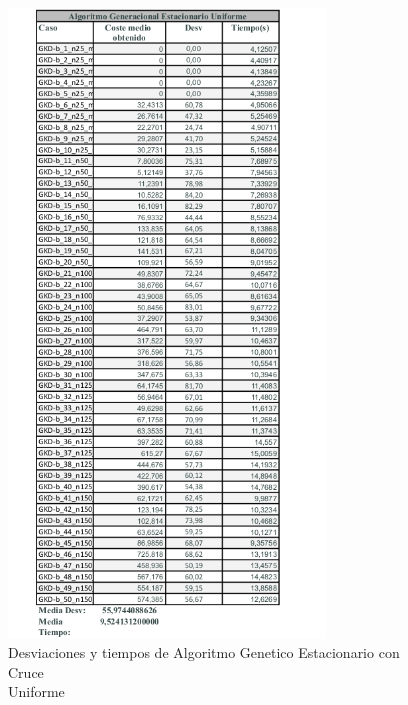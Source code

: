 \documentclass{article}
\begin{document}
\begin{figure}[h]
  \centering
  \includegraphics[width=0.75\textwidth]{capturastablas/AGE-Uniforme.png}
  \caption{Desviaciones y tiempos de Algoritmo Genetico Estacionario con Cruce \\
  Uniforme}
\end{figure}
\end{document}
